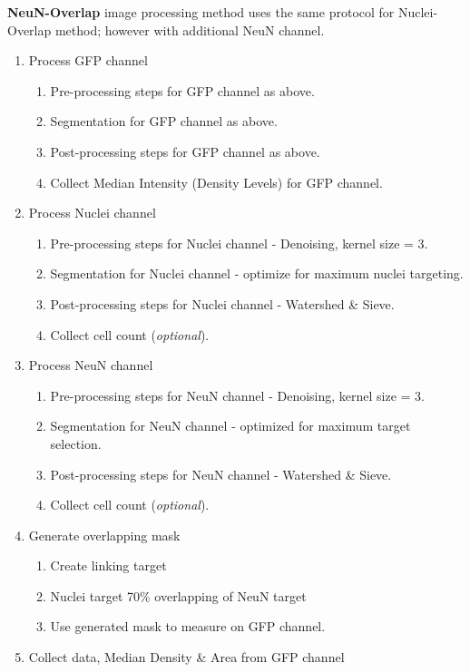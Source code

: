 \noindent\textbf{NeuN-Overlap} image processing method uses the same protocol for Nuclei-Overlap method; however with additional NeuN channel.
\begin{enumerate}
\item Process GFP channel
  \begin{enumerate}
  \item Pre-processing steps for GFP channel as above.
  \item Segmentation for GFP channel as above.
  \item Post-processing steps for GFP channel as above.
  \item Collect Median Intensity (Density Levels) for GFP channel.
  \end{enumerate}
\item Process Nuclei channel
  \begin{enumerate}
  \item Pre-processing steps for Nuclei channel - Denoising, kernel size = 3.
  \item Segmentation for Nuclei channel - optimize for maximum nuclei targeting.
  \item Post-processing steps for Nuclei channel - Watershed \& Sieve.
  \item Collect cell count (\textit{optional}).
  \end{enumerate}
\item Process NeuN channel
  \begin{enumerate}
  \item Pre-processing steps for NeuN channel - Denoising, kernel size = 3.
  \item Segmentation for NeuN channel - optimized for maximum target selection.
  \item Post-processing steps for NeuN channel - Watershed \& Sieve.
  \item Collect cell count (\textit{optional}).
  \end{enumerate}
\item Generate overlapping mask
  \begin{enumerate}
  \item Create linking target
  \item Nuclei target 70\% overlapping of NeuN target
  \item Use generated mask to measure on GFP channel.
  \end{enumerate}
\item Collect data, Median Density \& Area from GFP channel
\end{enumerate}

